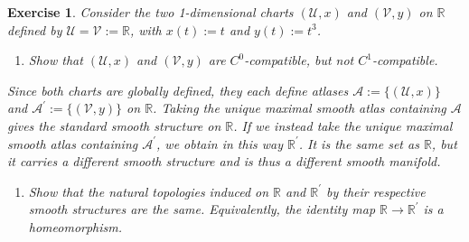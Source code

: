 \documentclass{book}
\theoremstyle{custom_definition}
\newtheorem{exercise}{Exercise}
\theoremstyle{custom_theorem}
\begin{document}
    \begin{exercise}
        Consider the two 1-dimensional charts \((\mathcal{U}, x)\) and \((\mathcal{V}, y)\) on \(\mathbb{R}\) defined by \(\mathcal{U} = \mathcal{V} := \mathbb{R}\), with \(x(t) := t\) and \(y(t) := t^3\).
        \begin{enumerate}
            \item Show that \((\mathcal{U}, x)\) and \((\mathcal{V}, y)\) are \(C^0\)-compatible, but not \(C^1\)-compatible.
        \end{enumerate}
        Since both charts are globally defined, they each define atlases \(\mathcal{A} := \{(\mathcal{U}, x)\}\) and \(\mathcal{A}^\prime := \{(\mathcal{V}, y)\}\) on \(\mathbb{R}\). Taking the unique maximal smooth atlas containing \(\mathcal{A}\) gives the standard smooth structure on \(\mathbb{R}\). If we instead take the unique maximal smooth atlas containing \(\mathcal{A}^\prime\), we obtain in this way \(\mathbb{R}^\prime\). It is the same set as \(\mathbb{R}\), but it carries a different smooth structure and is thus a different smooth manifold.
        \begin{enumerate}[resume]
            \item Show that the natural topologies induced on \(\mathbb{R}\) and \(\mathbb{R}^\prime\) by their respective smooth structures are the same. Equivalently, the identity map \(\mathbb{R} \longrightarrow \mathbb{R}^\prime\) is a homeomorphism.
        \end{enumerate}
    \end{exercise}
\end{document}
